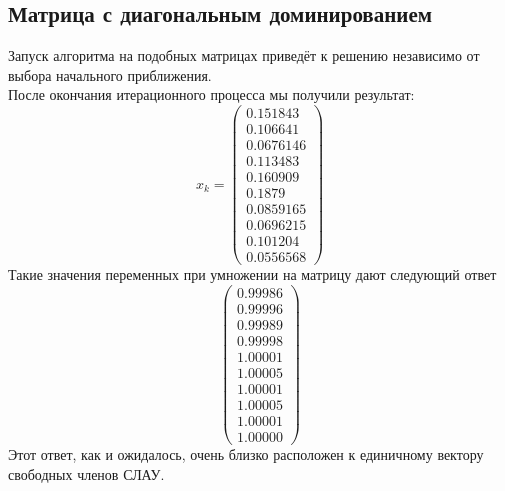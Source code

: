 \documentclass[../../report.tex]{subfiles}
\begin{document}
\subsection{Матрица с диагональным доминированием}
Запуск алгоритма на подобных матрицах приведёт к 
решению независимо от выбора начального приближения. \\
После окончания итерационного процесса мы получили результат:
\[
x_k = 
\begin{pmatrix} 
  0.151843  \\ 
  0.106641  \\ 
  0.0676146 \\ 
  0.113483  \\ 
  0.160909  \\ 
  0.1879    \\ 
  0.0859165 \\ 
  0.0696215 \\ 
  0.101204  \\ 
  0.0556568 
\end{pmatrix}
\]
Такие значения переменных при умножении на матрицу дают следующий ответ
\[
\begin{pmatrix}
  0.99986 \\
  0.99996 \\
  0.99989 \\
  0.99998 \\
  1.00001 \\
  1.00005 \\
  1.00001 \\
  1.00005 \\
  1.00001 \\
  1.00000
\end{pmatrix}
\]
Этот ответ, как и ожидалось, очень близко расположен к единичному вектору свободных членов СЛАУ.
\end{document}
